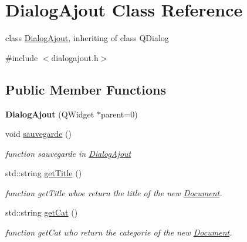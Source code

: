 \hypertarget{classDialogAjout}{
\section{DialogAjout Class Reference}
\label{classDialogAjout}
}


class \hyperlink{classDialogAjout}{DialogAjout}, inheriting of class QDialog  




{\ttfamily \#include $<$dialogajout.h$>$}

\subsection*{Public Member Functions}
\begin{DoxyCompactItemize}
\item 
\hypertarget{classDialogAjout_aaeabc0c9e541d0f18de919d2fea1a1a3}{
{\bfseries DialogAjout} (QWidget $\ast$parent=0)}
\label{classDialogAjout_aaeabc0c9e541d0f18de919d2fea1a1a3}

\item 
void \hyperlink{classDialogAjout_a72cebaf0d6182830a4a31c24b32911a8}{sauvegarde} ()
\begin{DoxyCompactList}\small\item\em function sauvegarde in \hyperlink{classDialogAjout}{DialogAjout} \item\end{DoxyCompactList}\item 
\hypertarget{classDialogAjout_acf81308622f54b686f629f87281e1051}{
std::string \hyperlink{classDialogAjout_acf81308622f54b686f629f87281e1051}{getTitle} ()}
\label{classDialogAjout_acf81308622f54b686f629f87281e1051}

\begin{DoxyCompactList}\small\item\em function getTitle whoe return the title of the new \hyperlink{classDocument}{Document}. \item\end{DoxyCompactList}\item 
\hypertarget{classDialogAjout_ae98149a8e53298df2c78f777fae0febd}{
std::string \hyperlink{classDialogAjout_ae98149a8e53298df2c78f777fae0febd}{getCat} ()}
\label{classDialogAjout_ae98149a8e53298df2c78f777fae0febd}

\begin{DoxyCompactList}\small\item\em function getCat who return the categorie of the new \hyperlink{classDocument}{Document}. \item\end{DoxyCompactList}\end{DoxyCompactItemize}


